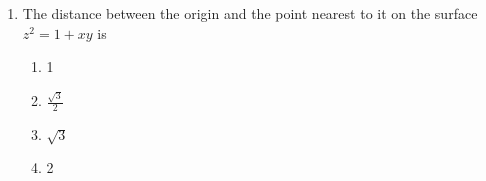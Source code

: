 \documentclass[journal]{IEEEtran}
\begin{document}
\begin{enumerate}
    \begin{center}
    \end{center}

    \begin{multicols}{4}
    \begin{enumerate}
        \item $\frac{\pi}{2} - 1$
        \item $\frac{\pi}{2} + 1$
        \item $\frac{\pi}{2}$
        \item 1
    \end{enumerate}
    \end{multicols}
    
    \item The distance between the origin and the point nearest to it on the surface
    $z^2 = 1 + xy$ is
    \begin{multicols}{4}
    \begin{enumerate}
        \item 1
        \item $\frac{\sqrt{3}}{2}$
        \item $\sqrt{3}$
        \item 2
    \end{enumerate}
    \end{multicols}
\end{enumerate}
\end{document}
